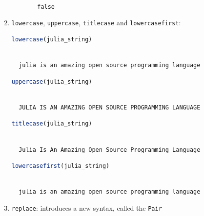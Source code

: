 \documentclass[
  notoc %
]{tufte-book}
\newcommand{\passthrough}[1]{#1}
\begin{document}
\begin{enumerate}
\begin{itemize}
    \begin{lstlisting}[language=Output]

    false

    \end{lstlisting}
  \end{itemize}
\item
  \passthrough{\lstinline!lowercase!},
  \passthrough{\lstinline!uppercase!},
  \passthrough{\lstinline!titlecase!} and
  \passthrough{\lstinline!lowercasefirst!}:

  \begin{lstlisting}[language=Julia]
  lowercase(julia_string)
  \end{lstlisting}

  \begin{lstlisting}[language=Output]

  julia is an amazing open source programming language

  \end{lstlisting}

  \begin{lstlisting}[language=Julia]
  uppercase(julia_string)
  \end{lstlisting}

  \begin{lstlisting}[language=Output]

  JULIA IS AN AMAZING OPEN SOURCE PROGRAMMING LANGUAGE

  \end{lstlisting}

  \begin{lstlisting}[language=Julia]
  titlecase(julia_string)
  \end{lstlisting}

  \begin{lstlisting}[language=Output]

  Julia Is An Amazing Open Source Programming Language

  \end{lstlisting}

  \begin{lstlisting}[language=Julia]
  lowercasefirst(julia_string)
  \end{lstlisting}

  \begin{lstlisting}[language=Output]

  julia is an amazing open source programming language

  \end{lstlisting}
\item
  \passthrough{\lstinline!replace!}: introduces a new syntax, called the
  \passthrough{\lstinline!Pair!}


\end{enumerate}
\end{document}
